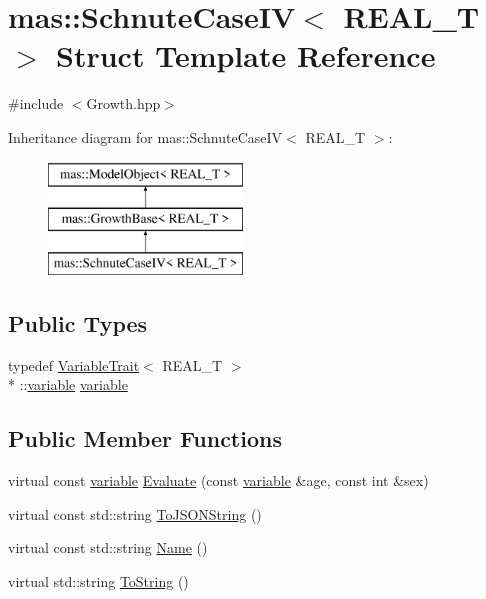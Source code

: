 \hypertarget{structmas_1_1_schnute_case_i_v}{\section{mas\-:\-:Schnute\-Case\-I\-V$<$ R\-E\-A\-L\-\_\-\-T $>$ Struct Template Reference}
\label{structmas_1_1_schnute_case_i_v}
}


{\ttfamily \#include $<$Growth.\-hpp$>$}

Inheritance diagram for mas\-:\-:Schnute\-Case\-I\-V$<$ R\-E\-A\-L\-\_\-\-T $>$\-:\begin{figure}[H]
\begin{center}
\leavevmode
\includegraphics[height=3.000000cm]{structmas_1_1_schnute_case_i_v}
\end{center}
\end{figure}
\subsection*{Public Types}
\begin{DoxyCompactItemize}
\item 
typedef \hyperlink{structmas_1_1_variable_trait}{Variable\-Trait}$<$ R\-E\-A\-L\-\_\-\-T $>$\\*
\-::\hyperlink{structmas_1_1_schnute_case_i_v_a80605d34c604eedf01a096cefbd776a5}{variable} \hyperlink{structmas_1_1_schnute_case_i_v_a80605d34c604eedf01a096cefbd776a5}{variable}
\end{DoxyCompactItemize}
\subsection*{Public Member Functions}
\begin{DoxyCompactItemize}
\item 
virtual const \hyperlink{structmas_1_1_schnute_case_i_v_a80605d34c604eedf01a096cefbd776a5}{variable} \hyperlink{structmas_1_1_schnute_case_i_v_a8100c63161dead550bf517365e355fec}{Evaluate} (const \hyperlink{structmas_1_1_schnute_case_i_v_a80605d34c604eedf01a096cefbd776a5}{variable} \&age, const int \&sex)
\item 
virtual const std\-::string \hyperlink{structmas_1_1_schnute_case_i_v_a1f6dc0866ead488d7258b75193305c9b}{To\-J\-S\-O\-N\-String} ()
\item 
virtual const std\-::string \hyperlink{structmas_1_1_schnute_case_i_v_a7193145ce124fd855fc7d950a936fc20}{Name} ()
\item 
virtual std\-::string \hyperlink{structmas_1_1_schnute_case_i_v_ac95b913d4a28421b37e8c91e76906f2d}{To\-String} ()
\end{DoxyCompactItemize}
